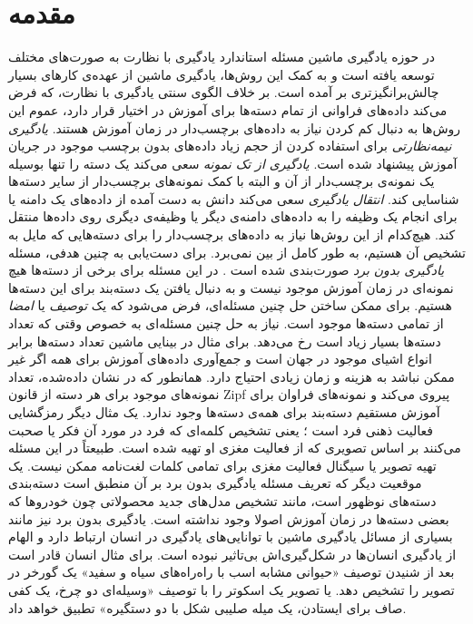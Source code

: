 \chapter{مقدمه } \label{intro}

 در حوزه یادگیری ماشین مسئله استاندارد یادگیری با نظارت به صورت‌های مختلف توسعه یافته است و به کمک این روش‌ها، یادگیری ماشین از عهده‌ی کارهای بسیار چالش‌برانگیزتری بر آمده است. بر خلاف الگوی سنتی یادگیری با نظارت، که فرض می‌کند داده‌های فراوانی از تمام دسته‌ها برای آموزش در اختیار قرار دارد، عموم این روش‌ها به دنبال کم کردن نیاز به داده‌های برچسب‌دار در زمان آموزش هستند.
\emph{ یادگیری نیمه‌نظارتی}  \cite{chapel06}
برای استفاده کردن از حجم زیاد داده‌های بدون برچسب موجود در جریان آموزش پیشنهاد شده است.
\emph{یادگیری از تک نمونه}  \cite{miller12}
سعی می‌کند یک دسته را تنها بوسیله یک نمونه‌ی برچسب‌دار از آن و البته با کمک نمونه‌های برچسب‌دار از سایر دسته‌ها شناسایی کند.
\emph{ انتقال یادگیری}  \cite{pan10survey}
سعی می‌کند دانش به دست آمده از داده‌های یک دامنه یا برای انجام یک وظیفه را به داده‌های دامنه‌ی دیگر یا وظیفه‌ی دیگری روی داده‌ها منتقل کند.
هیچ‌کدام از این روش‌ها نیاز به داده‌های برچسب‌دار را برای دسته‌هایی که مایل به تشخیص آن هستیم، به طور کامل از بین نمی‌برد. برای دست‌یابی به چنین هدفی،
مسئله \textit{یادگیری بدون برد}  صورت‌بندی شده است \cite{bengio08}. در این مسئله برای برخی از دسته‌ها هیچ نمونه‌ای در زمان آموزش موجود نیست و به دنبال یافتن یک دسته‌بند برای این دسته‌ها هستیم. برای ممکن ساختن حل چنین مسئله‌ای، فرض می‌شود که یک \emph{ توصیف} یا \emph{امضا}  از تمامی دسته‌ها موجود است. نیاز به حل  چنین مسئله‌ای به خصوص وقتی که تعداد دسته‌ها بسیار زیاد است رخ می‌دهد. برای مثال در بینایی ماشین تعداد دسته‌ها برابر انواع اشیای موجود در جهان است و جمع‌آوری داده‌های آموزش برای همه اگر غیر ممکن نباشد به هزینه و زمان زیادی احتیاج دارد. همانطور که در
\cite{sala11}
نشان داده‌شده، تعداد نمونه‌های موجود برای هر دسته از قانون Zipf پیروی می‌کند و نمونه‌های فراوان برای آموزش مستقیم دسته‌بند برای همه‌ی دسته‌ها وجود ندارد.
 یک مثال دیگر رمزگشایی فعالیت ذهنی فرد است
\cite{hinton09}؛
یعنی تشخیص کلمه‌ای که فرد در مورد آن فکر یا صحبت می‌کنند بر اساس تصویری که از فعالیت مغزی او تهیه شده است. طبیعتاً در این مسئله تهیه تصویر یا سیگنال فعالیت مغزی برای تمامی کلمات لغت‌نامه ممکن نیست. یک موقعیت دیگر که تعریف مسئله یادگیری بدون برد بر آن منطبق است دسته‌بندی دسته‌های نوظهور است، مانند تشخیص مدل‌های جدید محصولاتی چون خودروها که بعضی دسته‌ها در زمان آموزش اصولا وجود نداشته است. یادگیری بدون برد نیز مانند بسیاری از مسائل یادگیری ماشین با توانایی‌های یادگیری در انسان ارتباط دارد و الهام از یادگیری انسان‌ها در شکل‌گیری‌اش بی‌تاثیر نبوده است. برای مثال انسان قادر است بعد از شنیدن توصیف «حیوانی مشابه اسب با راه‌راه‌های سیاه و سفید» یک گورخر در تصویر را تشخیص دهد. یا تصویر یک اسکوتر را با توصیف «وسیله‌ای دو چرخ، یک کفی صاف برای ایستادن، یک میله صلیبی شکل با دو دستگیره» تطبیق خواهد داد.

